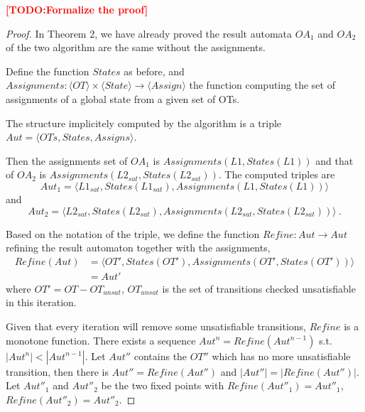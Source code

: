 \documentclass[smallcondensed]{svjour3}
\newcommand{\TODO}[1]{\textcolor{red}{\textbf{[TODO:#1]}}}
\begin{document}
\TODO{Formalize the proof}
\begin{proof}
In Theorem 2, we have already proved the result automata $OA_1$ and $OA_2$ of the two algorithm are the same without the assignments.

Define the function $States$ as before, and  $Assignments : \langle OT\rangle\times\langle State\rangle\rightarrow\langle Assign\rangle$ the function
computing the set of assignments of a global state from a given set of OTs.

The structure implicitely computed by the algorithm is a triple $ Aut= \langle OTs, States, Assigns\rangle$.

Then the assignments set of $OA_1$ is $Assignments(L1, States(L1))$ and that of $OA_2$ is $Assignments(L2_{sat}, States(L2_{sat}))$. The computed triples are 
\[Aut_1 = \langle L1_{sat}, States(L1_{sat}), Assignments(L1, States(L1))\rangle\] and \[Aut_2 = \langle L2_{sat}, States(L2_{sat}), Assignments(L2_{sat}, States(L2_{sat}))\rangle \ . \]

Based on the notation of the triple, we define the function $Refine : Aut \rightarrow Aut$ refining the result automaton together with the assignments,
\begin{align*}
Refine(Aut) &=\langle OT', States(OT'), Assignments(OT', States(OT'))\rangle \\
&=Aut'
\end{align*}
where $OT' = OT - OT_{unsat}$, $OT_{unsat}$ is the set of transitions checked unsatisfiable in this iteration.

Given that every iteration will remove some unsatisfiable transitions, $Refine$ is a monotone function. There exists a sequence $Aut^n = Refine(Aut^{n-1})$ s.t. $|Aut^n| < |Aut^{n-1}|$.
Let $Aut''$ contains the $OT''$ which has no more unsatisfiable transition, then there is $Aut'' = Refine(Aut'')$ and $|Aut''| = |Refine(Aut'')|$.
Let $Aut''_1$ and $Aut''_2$ be the two
 fixed points with $Refine(Aut''_1) = Aut''_1$, $Refine(Aut''_2) = Aut''_2$.


\end{proof}
\end{document}
